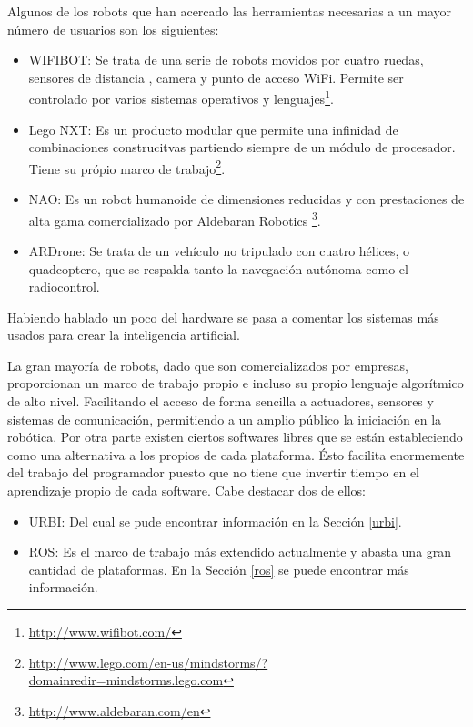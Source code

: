 \documentclass[12pt,a4paper,final,twoside]{article}
\begin{document}
Algunos de los robots que han acercado las herramientas necesarias a un mayor número de usuarios son los siguientes: 

\begin{itemize}
\item WIFIBOT: Se trata de una serie de robots movidos por cuatro ruedas, sensores de distancia , camera y punto de acceso WiFi. Permite ser controlado por varios sistemas operativos y lenguajes\footnote{\url{http://www.wifibot.com/}}.
\item Lego NXT: Es un producto modular que permite una infinidad de combinaciones construcitvas partiendo siempre de un módulo de procesador. Tiene su própio marco de trabajo\footnote{\url{http://www.lego.com/en-us/mindstorms/?domainredir=mindstorms.lego.com}}.
\item NAO: Es un robot humanoide de dimensiones reducidas y con prestaciones de alta gama comercializado por Aldebaran Robotics \footnote{\url{http://www.aldebaran.com/en}}.
\item ARDrone: Se trata de un vehículo no tripulado con cuatro hélices, o quadcoptero,  que se respalda tanto la navegación autónoma como el radiocontrol.
\end{itemize}

Habiendo hablado un poco del hardware se pasa a comentar los sistemas más usados para crear la inteligencia artificial.

La gran mayoría de robots, dado que son comercializados por empresas, proporcionan un marco de trabajo propio e incluso su propio lenguaje algorítmico de alto nivel. Facilitando el acceso de forma sencilla a actuadores, sensores y sistemas de comunicación, permitiendo a un amplio público la iniciación en la robótica.
Por otra parte existen ciertos softwares libres que se están estableciendo como una alternativa a los propios de cada plataforma.
Ésto facilita enormemente del trabajo del programador puesto que no tiene que invertir tiempo en el aprendizaje propio de cada software. 
Cabe destacar dos de ellos:

\begin{itemize}
\item URBI\cite{urbiref}: Del cual se pude encontrar información en la Sección \ref{urbi}.
\item ROS: Es el marco de trabajo más extendido actualmente y abasta una gran cantidad de plataformas. En la Sección \ref{ros} se puede encontrar más información.
\end{itemize} 
\end{document}
